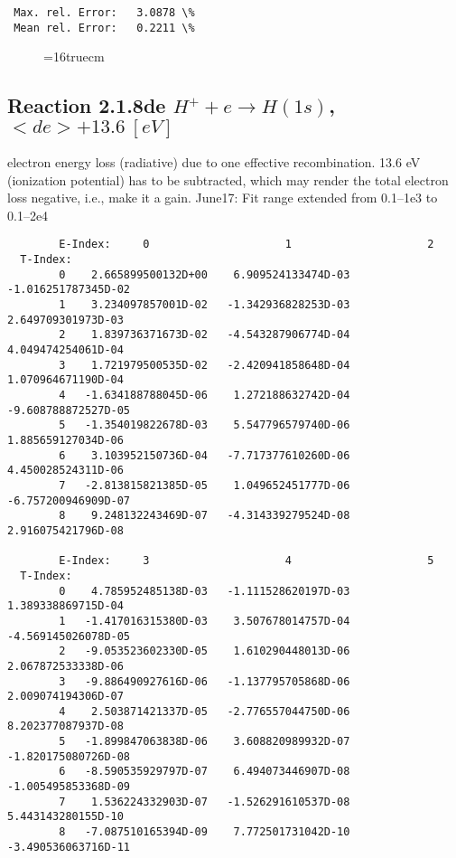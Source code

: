 \documentclass[12pt,dvipdfmx]{article}
\begin{document}
{\begin{small}
\begin{verbatim}
 Max. rel. Error:   3.0878 \%
 Mean rel. Error:   0.2211 \%

\end{verbatim}\end{small}
\begin{figure} \label{2.1.8rtot}
\epsfxsize=16truecm
\end{figure}
\newpage



\subsection{
  Reaction 2.1.8de $H^+  + e \rightarrow H(1s) $, \  $<de> + 13.6 \ [eV] $
}

  electron energy loss (radiative) due to one effective recombination.
  13.6 eV (ionization potential) has to be
  subtracted, which may render the total electron loss negative, i.e., make it a gain.
  June17: Fit range extended from 0.1--1e3 to 0.1--2e4

\begin{small}\begin{verbatim}
        E-Index:     0                     1                     2
  T-Index:
        0    2.665899500132D+00    6.909524133474D-03   -1.016251787345D-02
        1    3.234097857001D-02   -1.342936828253D-03    2.649709301973D-03
        2    1.839736371673D-02   -4.543287906774D-04    4.049474254061D-04
        3    1.721979500535D-02   -2.420941858648D-04    1.070964671190D-04
        4   -1.634188788045D-06    1.272188632742D-04   -9.608788872527D-05
        5   -1.354019822678D-03    5.547796579740D-06    1.885659127034D-06
        6    3.103952150736D-04   -7.717377610260D-06    4.450028524311D-06
        7   -2.813815821385D-05    1.049652451777D-06   -6.757200946909D-07
        8    9.248132243469D-07   -4.314339279524D-08    2.916075421796D-08

        E-Index:     3                     4                     5
  T-Index:
        0    4.785952485138D-03   -1.111528620197D-03    1.389338869715D-04
        1   -1.417016315380D-03    3.507678014757D-04   -4.569145026078D-05
        2   -9.053523602330D-05    1.610290448013D-06    2.067872533338D-06
        3   -9.886490927616D-06   -1.137795705868D-06    2.009074194306D-07
        4    2.503871421337D-05   -2.776557044750D-06    8.202377087937D-08
        5   -1.899847063838D-06    3.608820989932D-07   -1.820175080726D-08
        6   -8.590535929797D-07    6.494073446907D-08   -1.005495853368D-09
        7    1.536224332903D-07   -1.526291610537D-08    5.443143280155D-10
        8   -7.087510165394D-09    7.772501731042D-10   -3.490536063716D-11


\end{verbatim}
\end{small}}
\end{document}
